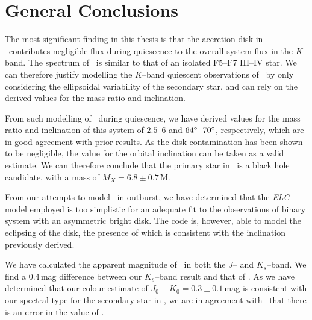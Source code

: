 
\chapter{General Conclusions}
\label{cha:GeneralConclusions}

The most significant finding in this thesis is that the accretion disk
in \\%
\groj\ contributes negligible flux during quiescence to the overall system flux in the $K$--band. The spectrum of \groj\ is similar to that of an
isolated F5--F7 III--IV star. We can therefore justify modelling
the $K$--band quiescent observations of \groj\ by only considering the ellipsoidal
variability of the secondary star, and can rely on the derived values
for the mass ratio and inclination. %

\vspace{\myparskip}

From such modelling of \groj\ during quiescence, we have derived
values for the mass ratio and inclination of this system of $2.5$--$6$
and $64\hbox{$^\circ$}$--$70\hbox{$^\circ$}$, respectively, which are in good agreement with
prior results. As the disk contamination has been shown to be
negligible, the value for the orbital inclination can be taken as a
valid estimate. We can therefore conclude that the primary star in
\groj\ is a black hole candidate, with a mass of $M_X =
6.8\pm0.7$\,M\sun. %

\vspace{\myparskip}

From our attempts to model \groj\ in outburst, we have determined that
the \textit{ELC} model employed is too simplistic for an adequate fit to
the observations of binary system with an asymmetric bright disk. The
code is, however, able to model the eclipsing of the disk, the
presence of which is consistent with the inclination previously
derived. %

\vspace{\myparskip}

We have calculated the apparent magnitude of \groj\ in both the $J$--
and $K_s$--band. We find a 0.4\,mag difference between our $K_s$--band
result and that of %
%
. As we have determined that our colour estimate of $J_{0} - K_{0} =
0.3\pm0.1$\,mag is consistent with our spectral type for the
secondary star in \groj, we are in agreement with %
%
\ that there is an error in the value of %
%
. %

